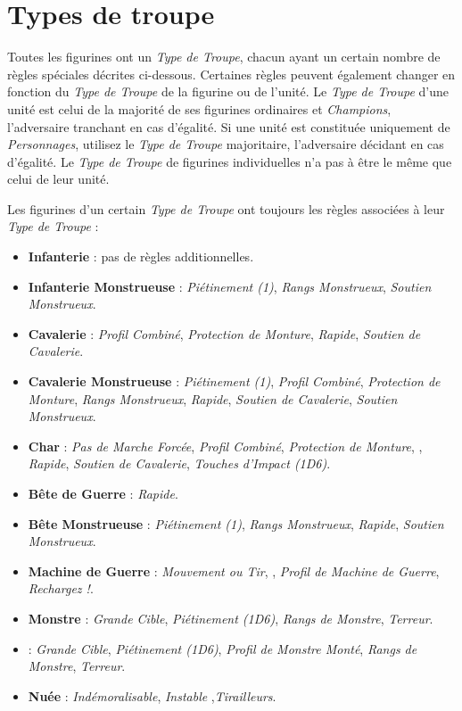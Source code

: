
\part{Types de troupe}
\label{types_de_troupe}

Toutes les figurines ont un \emph{Type de Troupe}, chacun ayant un certain nombre de règles spéciales décrites ci-dessous. Certaines règles peuvent également changer en fonction du \emph{Type de Troupe} de la figurine ou de l'unité. Le \emph{Type de Troupe} d'une unité est celui de la majorité de ses figurines ordinaires et \emph{Champions}, l'adversaire tranchant en cas d'égalité. Si une unité est constituée uniquement de \emph{Personnages}, utilisez le \emph{Type de Troupe} majoritaire, l'adversaire décidant en cas d'égalité. Le \emph{Type de Troupe} de figurines individuelles n'a pas à être le même que celui de leur unité.

Les figurines d'un certain \emph{Type de Troupe} ont toujours les règles associées à leur \emph{Type de Troupe} :
\begin{itemize}[label={-}, itemsep=0.2cm]
\item \textbf{Infanterie} : pas de règles additionnelles.
\item \textbf{Infanterie Monstrueuse} : \emph{Piétinement (1)}, \emph{Rangs Monstrueux}, \emph{Soutien Monstrueux}.
\item \textbf{Cavalerie} : \emph{Profil Combiné}, \emph{Protection de Monture}, \emph{Rapide}, \emph{Soutien de Cavalerie}.
\item \textbf{Cavalerie Monstrueuse} : \emph{Piétinement (1)}, \emph{Profil Combiné}, \emph{Protection de Monture}, \emph{Rangs Monstrueux}, \emph{Rapide}, \emph{Soutien de Cavalerie}, \emph{Soutien Monstrueux}.
\item \textbf{Char} :  \emph{Pas de Marche Forcée}, \emph{Profil Combiné}, \emph{Protection de Monture}, \emph{}, \emph{Rapide}, \emph{Soutien de Cavalerie}, \emph{Touches d'Impact (1D6)}.
\item \textbf{Bête de Guerre} : \emph{Rapide}.
\item \textbf{Bête Monstrueuse} : \emph{Piétinement (1)}, \emph{Rangs Monstrueux}, \emph{Rapide}, \emph{Soutien Monstrueux}.
\item \textbf{Machine de Guerre} : \emph{Mouvement ou Tir}, \emph{}, \emph{Profil de Machine de Guerre}, \emph{Rechargez !}.
\item \textbf{Monstre} : \emph{Grande Cible}, \emph{Piétinement (1D6)}, \emph{Rangs de Monstre}, \emph{Terreur}.
\item \textbf{} :  \emph{Grande Cible}, \emph{Piétinement (1D6)}, \emph{Profil de Monstre Monté}, \emph{Rangs de Monstre}, \emph{Terreur}.
\item \textbf{Nuée} : \emph{Indémoralisable}, \emph{Instable} ,\emph{Tirailleurs}.
\end{itemize}

